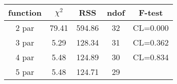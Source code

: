 \begin{tabular}{c|c|c|c|c}
function & $\chi^2$ & RSS & ndof & F-test \\
\hline
2 par & 79.41 & 594.86 & 32 & CL=0.000 \\
3 par & 5.29 & 128.34 & 31 & CL=0.362 \\
4 par & 5.48 & 124.89 & 30 & CL=0.834 \\
5 par & 5.48 & 124.71 & 29 & \\
\hline
\end{tabular}